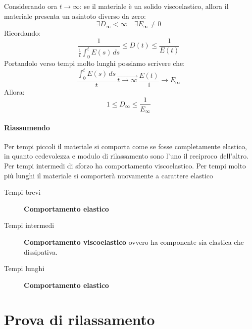 Considerando ora $t \rightarrow \infty$: se il materiale è un solido viscoelastico, allora il materiale presenta un asintoto diverso da zero:
\begin{equation}
\exists D_{\infty} < \infty \quad \exists E_{\infty} \neq 0
\end{equation}
Ricordando:
\begin{equation}
\frac{1}{\frac{1}{t}\int_0^t{E(s)\,ds}} \leq D(t) \leq \frac{1}{E(t)}
\end{equation}
Portandolo verso tempi molto lunghi possiamo scrivere che:
\begin{equation}
\frac{\int_0^t{E(s)\,ds}}{t} \, \overrightarrow{t \rightarrow \infty} \, \frac{E(t)}{1}\rightarrow E_{\infty}
\end{equation}
Allora:
\begin{equation}
1 \leq D_{\infty} \leq \frac{1}{E_{\infty}}
\end{equation}

\paragraph{Riassumendo}
Per tempi piccoli il materiale si comporta come se fosse completamente elastico, in quanto cedevolezza e modulo di rilassamento sono l'uno il reciproco dell'altro.
Per tempi intermedi di sforzo ha comportamento viscoelastico.
Per tempi molto più lunghi il materiale si comporterà nuovamente a carattere elastico
\begin{description}
\item[Tempi brevi] \textbf{Comportamento elastico}
\item[Tempi intermedi] \textbf{Comportamento viscoelastico} ovvero ha componente sia elastica che dissipativa.
\item[Tempi lunghi] \textbf{Comportamento elastico}
\end{description}

\section{Prova di rilassamento}
